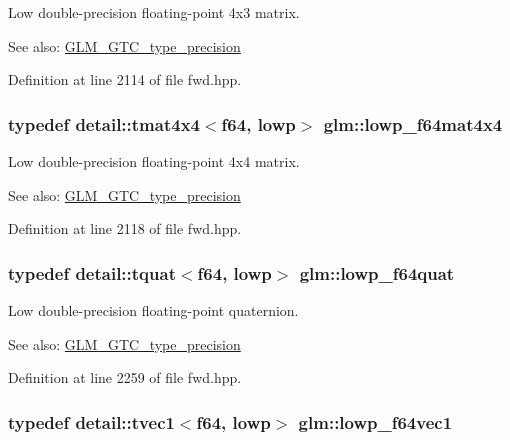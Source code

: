 Low double-precision floating-point 4x3 matrix. \begin{Desc}
\item[See also:]\hyperlink{group__gtc__type__precision}{GLM\_\-GTC\_\-type\_\-precision} \end{Desc}


Definition at line 2114 of file fwd.hpp.\hypertarget{group__gtc__type__precision_gb7d0922ed8d93ee3ce995858feb41231}{
\subsubsection[lowp\_\-f64mat4x4]{\setlength{\rightskip}{0pt plus 5cm}typedef detail::tmat4x4$<$f64, lowp$>$ {\bf glm::lowp\_\-f64mat4x4}}}
\label{group__gtc__type__precision_gb7d0922ed8d93ee3ce995858feb41231}


Low double-precision floating-point 4x4 matrix. \begin{Desc}
\item[See also:]\hyperlink{group__gtc__type__precision}{GLM\_\-GTC\_\-type\_\-precision} \end{Desc}


Definition at line 2118 of file fwd.hpp.\hypertarget{group__gtc__type__precision_g225e6f95dd6a7049b1a86db23b90cbac}{
\subsubsection[lowp\_\-f64quat]{\setlength{\rightskip}{0pt plus 5cm}typedef detail::tquat$<$f64, lowp$>$ {\bf glm::lowp\_\-f64quat}}}
\label{group__gtc__type__precision_g225e6f95dd6a7049b1a86db23b90cbac}


Low double-precision floating-point quaternion. \begin{Desc}
\item[See also:]\hyperlink{group__gtc__type__precision}{GLM\_\-GTC\_\-type\_\-precision} \end{Desc}


Definition at line 2259 of file fwd.hpp.\hypertarget{group__gtc__type__precision_g47d9eed23b6e3fc58676176be392293a}{
\subsubsection[lowp\_\-f64vec1]{\setlength{\rightskip}{0pt plus 5cm}typedef detail::tvec1$<$f64, lowp$>$ {\bf glm::lowp\_\-f64vec1}}}
\label{group__gtc__type__precision_g47d9eed23b6e3fc58676176be392293a}


